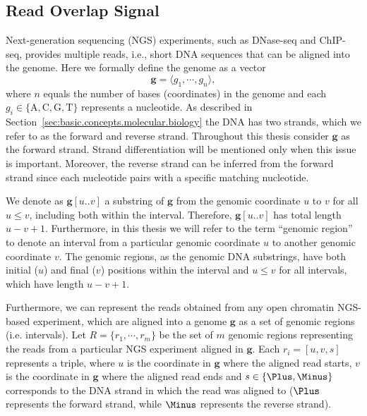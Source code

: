 \subsection{Read Overlap Signal}
\label{sec:read.overlap.signal}

Next-generation sequencing (NGS) experiments, such as DNase-seq and ChIP-seq, provides multiple reads, i.e., short DNA sequences that can be aligned into the genome. Here we formally define the genome as a vector
\begin{equation}
  \label{eq:genome}
  \mathbf{g} = \langle {g}_{1}, \cdots, {g}_{n} \rangle,
\end{equation}
where $n$ equals the number of bases (coordinates) in the genome and each ${g}_{i} \in \{\text{A}, \text{C}, \text{G}, \text{T}\}$ represents a nucleotide. As described in Section~\ref{sec:basic.concepts.molecular.biology} the DNA has two strands, which we refer to as the forward and reverse strand. Throughout this thesis consider $\mathbf{g}$ as the forward strand. Strand differentiation will be mentioned only when this issue is important. Moreover, the reverse strand can be inferred from the forward strand since each nucleotide pairs with a specific matching nucleotide.

We denote as $\mathbf{g}[u..v]$ a substring of $\mathbf{g}$ from the genomic coordinate $u$ to $v$ for all $u \leq v$, including both within the interval. Therefore, $\mathbf{g}[u..v]$ has total length $u-v+1$. Furthermore, in this thesis we will refer to the term ``genomic region'' to denote an interval from a particular genomic coordinate $u$ to another genomic coordinate $v$. The genomic regions, as the genomic DNA substrings, have both initial ($u$) and final ($v$) positions within the interval and $u \leq v$ for all intervals, which have length $u-v+1$.

Furthermore, we can represent the reads obtained from any open chromatin NGS-based experiment, which are aligned into a genome $\mathbf{g}$ as a set of genomic regions (i.e. intervals). Let $ R = \{ {r}_{1}, \cdots, {r}_{m} \}$ be the set of $m$ genomic regions representing the reads from a particular NGS experiment aligned in $\mathbf{g}$. Each ${r}_{i} = [u, v, s]$ represents a triple, where $u$ is the coordinate in $\mathbf{g}$ where the aligned read starts, $v$ is the coordinate in $\mathbf{g}$ where the aligned read ends and $s \in \{\Plus, \Minus\}$ corresponds to the DNA strand in which the read was aligned to ($\Plus$ represents the forward strand, while $\Minus$ represents the reverse strand).

